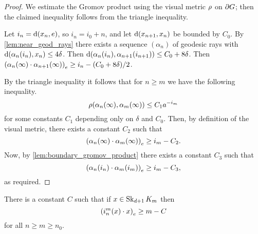 \documentclass[a4paper]{article}
\begin{document}
\begin{proof}
  We estimate the Gromov product using the visual metric $\vdistance$ on 
  $\boundary G$; then the claimed inequality follows from the triangle 
  inequality. 
  
  Let $i_n = \dist(x_n, e)$, so $i_n = i_0 + n$, and let 
  $\dist(x_{n+1},x_n)$ be bounded by $C_0$. By 
  \cref{lem:near_geod_rays} there exists a sequence $(\alpha_n)$ of 
  geodesic rays with $\dist(\alpha_n(i_n), x_n) \leq 4\delta$. Then 
  $\dist(\alpha_n(i_n), \alpha_{n+1}(i_{n+1})) \leq C_0 + 8\delta$. Then 
  $\gromov{e}{\alpha_n(\infty)}{ \alpha_{n+1}(\infty)} \geq i_n - (C_0 + 
  8\delta)/2$.

  By the triangle inequality it follows that for $n\geq m$ we have the following 
  inequality.
  \begin{equation*}
    \vdistance(\alpha_n(\infty), \alpha_m(\infty)) \leq C_1 a^{-i_m}
  \end{equation*}
  for some constants $C_1$ depending only on $\delta$ and $C_0$. Then, by
  definition of the visual metric, there exists a constant $C_2$ such that
  \begin{equation*}
    \gromov{e}{\alpha_n(\infty)}{\alpha_m(\infty)} \geq i_m - C_2.
  \end{equation*}
  Now, by \cref{lem:boundary_gromov_product} there exists a constant $C_3$ such
  that
  \begin{equation*}
    \gromov{e}{\alpha_n(i_n)}{\alpha_m(i_m)} \geq i_m - C_3,
  \end{equation*}
  as required.
\end{proof}

\begin{lemma}\label{lem:linearproduct}
  There is a constant $C$ such that if $x \in \Skel_{d+1} K_m$ then
  \begin{equation*}
    \gromov{e}{i^m_n(x)}{x} \geq m - C
  \end{equation*}
  for all $n\geq m\geq n_0$.
\end{lemma}
\end{document}
